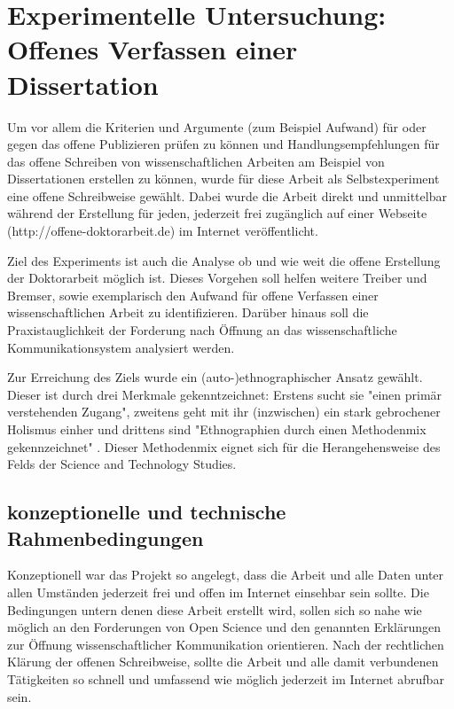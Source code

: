 \chapter{Experimentelle Untersuchung: Offenes Verfassen einer Dissertation}

Um vor allem die Kriterien und Argumente (zum Beispiel Aufwand) für oder gegen das offene Publizieren prüfen zu können und Handlungsempfehlungen für das offene Schreiben von wissenschaftlichen Arbeiten am Beispiel von Dissertationen erstellen zu können, wurde für diese Arbeit als Selbstexperiment eine offene Schreibweise gewählt. Dabei wurde die Arbeit direkt und unmittelbar während der Erstellung für jeden, jederzeit frei zugänglich auf einer Webseite (http://offene-doktorarbeit.de) im Internet veröffentlicht.

Ziel des Experiments ist auch die Analyse ob und wie weit die offene Erstellung der Doktorarbeit möglich ist. Dieses Vorgehen soll helfen weitere Treiber und Bremser, sowie exemplarisch den Aufwand für offene Verfassen einer wissenschaftlichen Arbeit zu identifizieren. Darüber hinaus soll die Praxistauglichkeit der Forderung nach Öffnung an das wissenschaftliche Kommunikationsystem analysiert werden.

Zur Erreichung des Ziels wurde ein (auto-)ethnographischer Ansatz gewählt. Dieser ist durch drei Merkmale gekenntzeichnet: Erstens sucht sie  "einen primär verstehenden Zugang", zweitens geht mit ihr (inzwischen) ein stark gebrochener Holismus einher und drittens sind "Ethnographien durch einen Methodenmix gekennzeichnet" \cite{bachmann_2011_ethnographie}. Dieser Methodenmix eignet sich für die Herangehensweise des Felds der Science and Technology Studies.

\section{konzeptionelle und technische Rahmenbedingungen}

Konzeptionell war das Projekt so angelegt, dass die Arbeit und alle Daten unter allen Umständen jederzeit frei und offen im Internet einsehbar sein sollte. Die Bedingungen untern denen diese Arbeit erstellt wird, sollen sich so nahe wie möglich an den Forderungen von Open Science und den genannten Erklärungen zur Öffnung wissenschaftlicher Kommunikation orientieren. Nach der rechtlichen Klärung der offenen Schreibweise, sollte die Arbeit und alle damit verbundenen Tätigkeiten so schnell und umfassend wie möglich jederzeit im Internet abrufbar sein.

